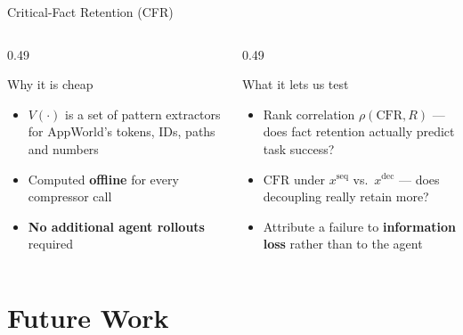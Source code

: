 \documentclass[usenames,dvipsnames,aspectratio=169,10pt]{beamer}
\begin{document}
\begin{frame}{Critical-Fact Retention (CFR)}
\begin{columns}[T]
\begin{column}{0.49\textwidth}
\begin{block}{Why it is cheap}
\footnotesize
\begin{itemize}
  \item $V(\cdot)$ is a set of pattern extractors for AppWorld's tokens, IDs,
        paths and numbers
  \item Computed \textbf{offline} for every compressor call
  \item \textbf{No additional agent rollouts} required
\end{itemize}
\end{block}
\end{column}
\begin{column}{0.49\textwidth}
\begin{block}{What it lets us test}
\footnotesize
\begin{itemize}
  \item Rank correlation $\rho(\mathrm{CFR},R)$ --- does fact retention
        actually predict task success?
  \item $\mathrm{CFR}$ under $x^{\mathrm{seq}}$ vs.\ $x^{\mathrm{dec}}$ ---
        does decoupling really retain more?
  \item Attribute a failure to \textbf{information loss} rather than to the
        agent
\end{itemize}
\end{block}
\end{column}
\end{columns}
\end{frame}

\section{Future Work}
\end{document}
